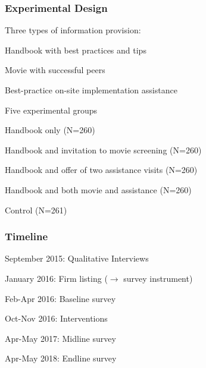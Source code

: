 \documentclass[hideothersubsections, usenames,dvipsnames,10pt]{beamer}
\newenvironment{itemize_3pt}{\itemize\addtolength{\itemsep}{3pt}}{\enditemize}
\newenvironment{enumerate_3pt}{\enumerate\addtolength{\itemsep}{3pt}}{\endenumerate}
\begin{document}
\begin{frame}
\frametitle{Experimental Design}
	\begin{itemize_3pt}
	\item Three types of information provision:
	\vspace{0.05in}
		\begin{itemize_3pt}
		\item \textcolor{bdf}{Handbook} with best practices and tips
		\item \textcolor{bdf}{Movie} with successful peers
		\item Best-practice on-site implementation \textcolor{bdf}{assistance}
		\end{itemize_3pt}
	\vspace{0.05in}
\end{itemize_3pt}
	\begin{itemize_3pt}
\item{Five experimental groups}
	\vspace{0.05in}
            \begin{enumerate_3pt}
              \item \textcolor{bdf}{Handbook} only (N=260)
              \item \textcolor{bdf}{Handbook} and invitation to \textcolor{bdf}{movie} screening (N=260)
              \item \textcolor{bdf}{Handbook} and offer of two \textcolor{bdf}{assistance} visits (N=260)
              \item \textcolor{bdf}{Handbook} and both \textcolor{bdf}{movie} and \textcolor{bdf}{assistance} (N=260)
              \item Control (N=261)
            \end{enumerate_3pt}
        \end{itemize_3pt}
\end{frame}


\begin{frame}
\frametitle{Timeline}
\begin{enumerate_3pt}
    \item September 2015: \textcolor{bdf}{Qualitative} Interviews
    \item January 2016: \textcolor{bdf}{Firm listing} ($\rightarrow$ survey instrument)
    \item Feb-Apr 2016: \textcolor{bdf}{Baseline} survey
    \item Oct-Nov 2016: \textcolor{bdf}{Interventions}
    \item Apr-May 2017: \textcolor{bdf}{Midline} survey
    \item Apr-May 2018: \textcolor{bdf}{Endline} survey
\end{enumerate_3pt}
\end{frame}
\end{document}
